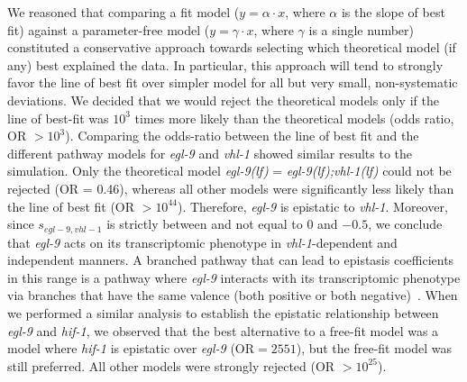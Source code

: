 \documentclass[9pt,twocolumn,twoside]{pnas-new}
\newcommand{\gene}[1]{\emph{#1}}
\newcommand{\egl}{\emph{\mbox{egl-9}(lf)}}
\newcommand{\eglvhl}{\emph{\mbox{egl-9(lf);vhl-1(lf)}}}
\begin{document}
We reasoned that comparing a fit model ($y = \alpha\cdot x$, where $\alpha$ is
the slope of best fit) against a parameter-free model ($y = \gamma\cdot x$,
where $\gamma$ is a single number) constituted a conservative approach towards
selecting which theoretical model (if any) best explained the data. In particular,
this approach will tend to strongly favor the line of best fit over simpler model
for all but very small, non-systematic deviations. We decided
that we would reject the theoretical models only if the line of best-fit
was $10^3$ times more likely than the theoretical models (odds ratio, OR $>10^3$).
Comparing the odds-ratio between the line of best fit and the different pathway
models for \gene{egl-9} and \gene{vhl-1} showed similar results to the simulation.
Only the theoretical model \egl{} = \eglvhl{} could not be rejected (OR = 0.46),
whereas all other models were significantly less likely than the line of best fit
(OR $>10^{44}$).
Therefore, \gene{egl-9} is epistatic to \gene{vhl-1}. Moreover,
since $s_{egl-9, vhl-1}$ is strictly between and not equal to $0$ and $-0.5$, we
conclude that \gene{egl-9} acts on its transcriptomic phenotype in
\gene{vhl-1}-dependent and independent manners. A branched pathway that can lead
to epistasis coefficients in this range is a pathway where \gene{egl-9} interacts
with its transcriptomic phenotype via branches that have the same valence (both
positive or both negative)~\cite{Shao2009}. When we performed a similar analysis
to establish the epistatic relationship between \gene{egl-9} and \gene{hif-1},
we observed that the best alternative to a free-fit model was a model where
\gene{hif-1} is epistatic over \gene{egl-9} (OR$=2551$), but the free-fit model
was still preferred. All other models were strongly rejected (OR $>10^{25}$).
\end{document}
